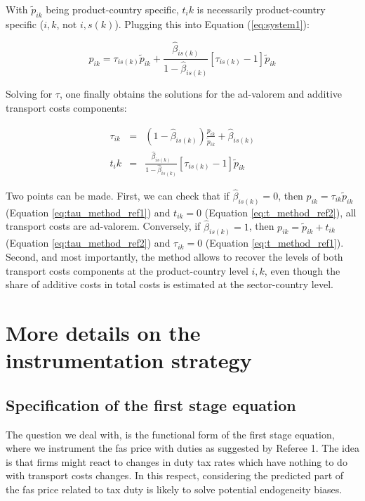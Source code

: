 \documentclass[a4paper,12pt]{article}
\begin{document}
With $\widetilde{p}_{ik} $ being product-country specific, $t_ik$ is necessarily product-country specific ($i,k$, not $i,s(k)$). Plugging this into Equation (\ref{eq:system1}):

$$p_{ik} = \tau_{is(k)} \widetilde{p}_{ik} + \frac{ \widehat{\beta}_{is(k)}}{1- \widehat{\beta}_{is(k)}} \left[\tau_{is(k)}-1\right]\widetilde{p}_{ik} $$

Solving for $\tau$, one finally obtains the solutions for the ad-valorem and additive transport costs components:

\begin{eqnarray}
\tau_{ik} & =& (1-\widehat{\beta}_{is(k)}) \frac{p_{ik}}{\widetilde{p}_{ik} } + \widehat{\beta}_{is(k)} \label{eq:tau_method_ref1}\\
t_ik &=& \frac{ \widehat{\beta}_{is(k)}}{1- \widehat{\beta}_{is(k)}} \left[\tau_{is(k)}-1\right]\widetilde{p}_{ik} \label{eq:t_method_ref1}
\end{eqnarray}


Two points can be made. First, we can check that if $\widehat{\beta}_{is(k)}=0$, then $p_{ik} = \tau_{ik} \widetilde{p}_{ik}$ (Equation \ref{eq:tau_method_ref1}) and $t_{ik} = 0$ (Equation \ref{eq:t_method_ref2}), all transport costs are ad-valorem. Conversely, if $\widehat{\beta}_{is(k)}=1$, then $p_{ik} = \widetilde{p}_{ik} + t_{ik} $ (Equation \ref{eq:tau_method_ref2}) and $\tau_{ik} = 0$ (Equation \ref{eq:t_method_ref1}). Second, and most importantly, the method allows to recover the levels of both transport costs components at the product-country level $i,k$, even though the share of additive costs in total costs is estimated at the sector-country level.



\section{More details on the instrumentation strategy}

\subsection{Specification of the first stage equation}


The question we deal with, is the functional form of the first stage equation, where we instrument the fas price with duties as suggested by Referee 1. The idea is that firms might react to changes in duty tax rates which have nothing to do with transport costs changes. In this respect, considering the predicted part of the fas price related to tax duty is likely to solve potential endogeneity biases.
\end{document}
